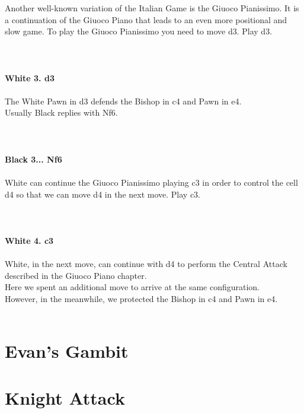 \documentclass{article}
\begin{document}
Another well-known variation of the Italian Game is the Giuoco Pianissimo. It is a continuation of the Giuoco Piano that leads to an even more positional and slow game. To play the Giuoco Pianissimo you need to move d3. Play d3.\\
\\

\\
\\
\textbf{White 3. d3}\\
\\
The White Pawn in d3 defends the Bishop in c4 and Pawn in e4.\\Usually Black replies with Nf6.\\
\\

\\
\\
\textbf{Black 3... Nf6}\\
\\
White can continue the Giuoco Pianissimo playing c3 in order to control the cell d4 so that we can move d4 in the next move. Play c3.\\
\\

\\
\\
\textbf{White 4. c3}\\
\\
White, in the next move, can continue with d4 to perform the Central Attack described in the Giuoco Piano chapter.\\Here we spent an additional move to arrive at the same configuration.\\However, in the meanwhile, we protected the Bishop in c4 and Pawn in e4.\\
\\
\section{ Evan's Gambit}

\section{ Knight Attack}
\end{document}
